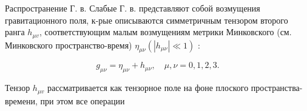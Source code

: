 \documentclass[10pt]{article}
\begin{document}
Распространение Г. в. Слабые Г. в. представляют собой возмущения гравитационного поля, к-рые описываются симметричным тензором второго ранга $h_{\mu v}$, соответствующим малым возмущениям метрики Минковского (см. Минковского пространство-время) $\eta_{\mu \nu}\left(\left|h_{\mu \nu}\right| \ll 1\right)$ :



\[

g_{\mu \nu}=\eta_{\mu \nu}+h_{\mu \nu}, \quad \mu, \nu=0,1,2,3 .

\]



Тензор $h_{\mu v}$ рассматривается как тензорное поле на фоне плоского пространства-времени, при этом все операции
\end{document}
